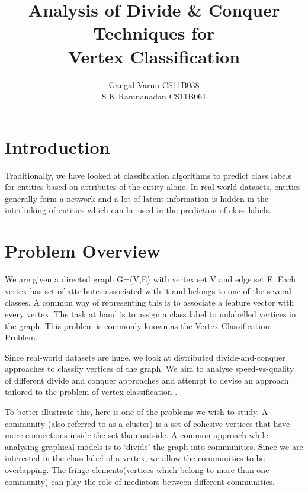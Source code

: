 \documentclass{article}
\begin{document}
\title{\textbf{Analysis of Divide \& Conquer Techniques for \\Vertex Classification}}
\author{ Gangal Varun CS11B038 \\
		 S K Ramnanadan CS11B061\\
[0.2in]
}

\maketitle
\section*{Introduction}
Traditionally, we have looked at classification algorithms to predict class labels for entities based on attributes of the entity alone. In real-world datasets, entities generally form a network and a lot of latent information is hidden in the interlinking of entities which can be used in the prediction of class labels. 
 


\section*{Problem Overview}
We are given a directed graph G=(V,E) with vertex set V and edge set E. Each vertex has set of attributes associated with it and belongs to one of the several classes. A common way of representing this is to associate a feature vector with every vertex. The task at hand is to assign a class label to unlabelled vertices in the graph. This problem is commonly known as the Vertex Classification Problem. 

Since real-world datasets are huge, we look at distributed divide-and-conquer approaches to classify vertices of the graph. We aim to analyse speed-vs-quality of different divide and conquer approaches and attempt to devise an approach tailored to the problem of vertex classification . 

To better illustrate this, here is one of the problems we wish to study. A community (also referred to as a cluster) is a set of cohesive vertices that have more connections inside the set than outside. A common approach while analysing graphical models is to ‘divide’ the graph into communities. Since we are interested in the class label of a vertex, we allow the communities to be overlapping. The fringe elements(vertices which belong to more than one community) can play the role of mediators between different communities. 
\end{document}
